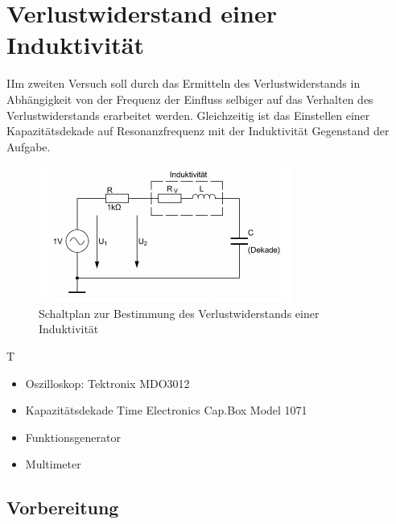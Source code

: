 \documentclass{article}
\begin{document}
\section{Verlustwiderstand einer Induktivität}
\begin{task}
  IIm zweiten Versuch soll durch das Ermitteln des Verlustwiderstands in Abhängigkeit von der Frequenz der Einfluss selbiger auf das Verhalten des Verlustwiderstands erarbeitet werden.
  Gleichzeitig ist das Einstellen einer Kapazitätsdekade auf Resonanzfrequenz mit der Induktivität Gegenstand der Aufgabe.
\end{task}
\begin{figure}[h]
  \begin{center}
    \includegraphics[scale=1]{assets/images/Versuch2Schaltplan.PNG}
    \caption{Schaltplan zur Bestimmung des Verlustwiderstands einer Induktivität}
  \end{center}
\end{figure}
\begin{devlist}
  T
  \begin{itemize}
    \item Oszilloskop: Tektronix MDO3012
    \item Kapazitätsdekade Time Electronics Cap.Box Model 1071
    \item Funktionsgenerator
    \item Multimeter
  \end{itemize}
\end{devlist}
\subsection{Vorbereitung}
\end{document}
